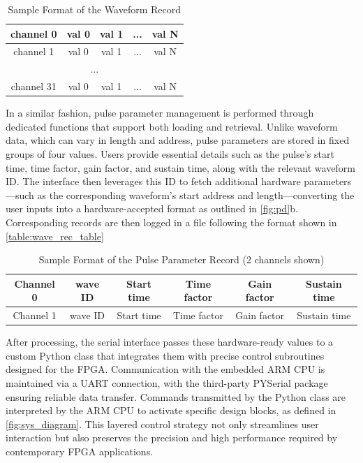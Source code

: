 \begin{table}[h]
\centering
\caption{Sample Format of the Waveform Record}
\label{table:param_rec_table}
\begin{tabular}{|c|c|c|c|c|}
\hline
channel 0 & val 0 & val 1 & ... & val N \\
\hline
channel 1 & val 0 & val 1 & ... & val N \\
\hline
\multicolumn{5}{|c|}{...} \\
\hline
channel 31 & val 0 & val 1 & ... & val N \\
\hline
\end{tabular}
\end{table}

In a similar fashion, pulse parameter management is performed through dedicated functions that support both loading and retrieval. Unlike waveform data, which can vary in length and address, pulse parameters are stored in fixed groups of four values. Users provide essential details such as the pulse's start time, time factor, gain factor, and sustain time, along with the relevant waveform ID. The interface then leverages this ID to fetch additional hardware parameters—such as the corresponding waveform's start address and length—converting the user inputs into a hardware-accepted format as outlined in \autoref{fig:pd}b. Corresponding records are then logged in a file following the format shown in \autoref{table:wave_rec_table}

\begin{table}[h]
\centering
\caption{Sample Format of the Pulse Parameter Record (2 channels shown)}
\label{table:wave_rec_table}
\begin{tabular}{|c|c|c|c|c|c|}
\hline
Channel 0 & wave ID & Start time & Time factor & Gain factor & Sustain time \\
\hline
Channel 1 & wave ID & Start time & Time factor & Gain factor & Sustain time \\
\hline
\end{tabular}
\end{table}

After processing, the serial interface passes these hardware-ready values to a custom Python class that integrates them with precise control subroutines designed for the FPGA. Communication with the embedded ARM CPU is maintained via a UART connection, with the third-party PYSerial package ensuring reliable data transfer. Commands transmitted by the Python class are interpreted by the ARM CPU to activate specific design blocks, as defined in \autoref{fig:sys_diagram}. This layered control strategy not only streamlines user interaction but also preserves the precision and high performance required by contemporary FPGA applications.